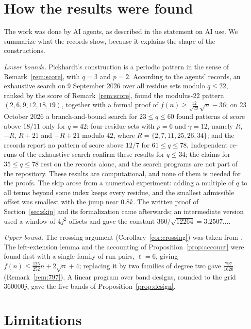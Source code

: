 \documentclass[11pt]{amsart}
\theoremstyle{remark}
\begin{document}
\section{How the results were found}\label{sec:discovery}

The work was done by AI agents, as described in the statement on AI use. We summarize what the records show, because it explains the
shape of the constructions.

\emph{Lower bounds.} Pickhardt's construction is a periodic pattern in the sense of Remark~\ref{rem:score}, with $q=3$ and $p=2$. According to the
agents' records, an exhaustive search on 9 September 2026 over all residue sets modulo $q\le22$, ranked by the score of
Remark~\ref{rem:score}, found the modulus-$22$ pattern $(2,6,9,12,18,19)$, together with a formal proof of
$f(n)\ge\frac{12}{\sqrt{22}}\sqrt n-36$; on 23 October 2026 a branch-and-bound search for $23\le q\le60$ found patterns of score above
$18/11$ only for $q=42$: four residue sets with $p=6$ and $\gamma=12$, namely $R$, $-R$, $R+21$ and $-R+21$ modulo $42$, where
$R=\{2,7,11,25,26,34\}$; and the records report no pattern of score above $12/7$ for $61\le q\le78$. Independent re-runs of the
exhaustive search confirm these results for $q\le34$; the claims for $35\le q\le78$ rest on the records alone, and the search programs
are not part of the repository. These results are computational, and none of them is needed for the proofs. The skip arose from a numerical experiment:
adding a multiple of $q$ to all terms beyond some index keeps every residue, and the smallest admissible offset was smallest with the jump
near $0.8k$. The written proof of Section~\ref{sec:skip} and its formalization came afterwards; an intermediate version used a window of
$4j^2$ offsets and gave the constant $360/\sqrt{12264}=3.2507\ldots$.

\emph{Upper bound.} The crossing argument (Corollary~\ref{cor:crossing}) was taken from \cite{EPDay2026}. The left-extension lemma and the
accounting of Proposition~\ref{prop:account} were found first with a single family of run pairs, $\ell=6$, giving
$f(n)\le\frac{125}{252}n+2\sqrt n+4$; replacing it by two families of degree two gave $\frac{797}{1620}$ (Remark~\ref{rem:797}). A
linear program over band designs, rounded to the grid $360000j$, gave the five bands of Proposition~\ref{prop:design}.

\section{Limitations}\label{sec:limits}
\end{document}
